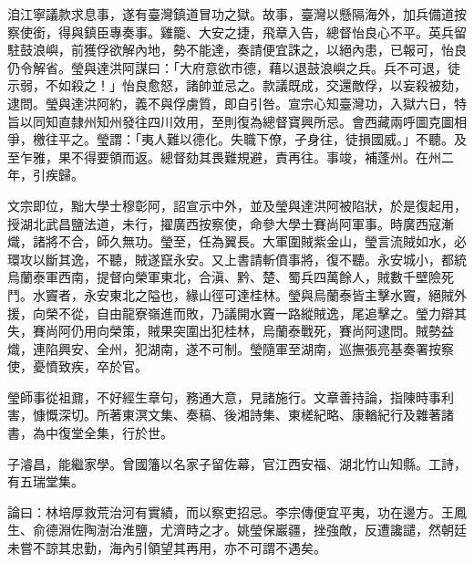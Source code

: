 \begin{pinyinscope}
洎江寧議款求息事，遂有臺灣鎮道冒功之獄。故事，臺灣以懸隔海外，加兵備道按察使銜，得與鎮臣專奏事。雞籠、大安之捷，飛章入告，總督怡良心不平。英兵留駐鼓浪嶼，前獲俘欲解內地，勢不能達，奏請便宜誅之，以絕內患，已報可，怡良仍令解省。瑩與達洪阿謀曰：「大府意欲市德，藉以退鼓浪嶼之兵。兵不可退，徒示弱，不如殺之！」怡良愈怒，諸帥並忌之。款議既成，交還敵俘，以妄殺被劾，逮問。瑩與達洪阿約，義不與俘虜質，即自引咎。宣宗心知臺灣功，入獄六日，特旨以同知直隸州知州發往四川效用，至則復為總督寶興所忌。會西藏兩呼圖克圖相爭，檄往平之。瑩謂：「夷人難以德化。失職下僚，孑身往，徒損國威。」不聽。及至乍雅，果不得要領而返。總督劾其畏難規避，責再往。事竣，補蓬州。在州二年，引疾歸。

文宗即位，黜大學士穆彰阿，詔宣示中外，並及瑩與達洪阿被陷狀，於是復起用，授湖北武昌鹽法道，未行，擢廣西按察使，命參大學士賽尚阿軍事。時廣西寇漸熾，諸將不合，師久無功。瑩至，任為翼長。大軍圍賊紫金山，瑩言流賊如水，必環攻以斷其逸，不聽，賊遂竄永安。又上書請斬僨事將，復不聽。永安城小，都統烏蘭泰軍西南，提督向榮軍東北，合滇、黔、楚、蜀兵四萬餘人，賊數千壁險死鬥。水竇者，永安東北之隘也，緣山徑可達桂林。瑩與烏蘭泰皆主擊水竇，絕賊外援，向榮不從，自由龍寮嶺進而敗，乃議開水竇一路縱賊逸，尾追擊之。瑩力辯其失，賽尚阿仍用向榮策，賊果突圍出犯桂林，烏蘭泰戰死，賽尚阿逮問。賊勢益熾，連陷興安、全州，犯湖南，遂不可制。瑩隨軍至湖南，巡撫張亮基奏署按察使，憂憤致疾，卒於官。

瑩師事從祖鼐，不好經生章句，務通大意，見諸施行。文章善持論，指陳時事利害，慷慨深切。所著東溟文集、奏稿、後湘詩集、東槎紀略、康輶紀行及雜著諸書，為中復堂全集，行於世。

子濬昌，能繼家學。曾國籓以名家子留佐幕，官江西安福、湖北竹山知縣。工詩，有五瑞堂集。

論曰：林培厚救荒治河有實績，而以察吏招忌。李宗傳便宜平夷，功在邊方。王鳳生、俞德淵佐陶澍治淮鹽，尤濟時之才。姚瑩保巖疆，挫強敵，反遭讒譴，然朝廷未嘗不諒其忠勤，海內引領望其再用，亦不可謂不遇矣。


\end{pinyinscope}
